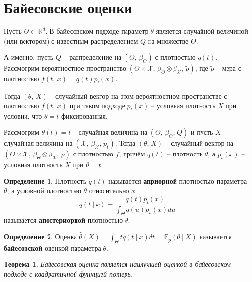 \documentclass[a4paper,12pt]{article}
\theoremstyle{plain}
\newtheorem{theorem}{Теорема}[section]
\theoremstyle{definition}
\newtheorem{definition}{Определение}[section]
\theoremstyle{remark}
\begin{document}
\section{Байесовские оценки}
Пусть $\Theta \subset \mathbb{R}^d$. В байесовском подходе параметр $\theta$ является случайной величиной (или вектором) с известным распределением $Q$ на множестве $\Theta$.

А именно, пусть $Q$ -- распределение на $(\Theta,\, \beta_\Theta)$ с плотностью $q(t)$. Рассмотрим вероятностное пространство $(\Theta \times\mathcal{X},\, \beta_\Theta\otimes\beta_\mathcal{X},\, \tilde{p})$, где $\tilde{p}$ -- мера с плотностью $f(t,\,x) = q(t)p_t(x)$. 

Тогда $(\theta,\, X)$ -- случайный вектор на этом вероятностном пространстве с плотностью $f(t,\,x)$ при таком подходе $p_t(x)$ -- условная плотность $X$ при условии, что $\theta = t$ фиксированная.

Рассмотрим $\theta(t) = t$ -- случайная величина на $(\Theta,\, \beta_\Theta,\, Q)$ и пусть $X$ -- случайная величина на $(\mathcal{X},\, \beta_\mathcal{X},\, p_t)$. Тогда $(\theta,\, X)$ -- случайный вектор на $(\Theta \times\mathcal{X},\, \beta_\Theta\otimes\beta_\mathcal{X},\, \tilde{p})$ с плотностью $f$, причём $q(t)$ -- плотность $\theta$, а $p_t(x)$ -- условная плотность $X$ при $\theta = t$

\begin{definition}
  Плотность $q(t)$ называется \textbf{априорной} плотностью параметра $\theta$, а условной плотностью $\theta$ относительно $x$ 
  \[
    q(t \:\vert\: x) = \frac{q(t)p_t(x)}{\int_\Theta q(u)p_u(x)du}
  \]
  называется \textbf{апостериорной} плотностью $\theta$.
\end{definition}

\begin{definition}
  Оценка $\hat{\theta}(X) = \int_\Theta tq(t \:\vert\: x)dt = \mathbb{E}_{\tilde{p}}(\theta \:\vert\: X)$ называется \textbf{байесовской} оценкой параметра $\theta$.
\end{definition}

\begin{theorem}
  Байесовская оценка является наилучшей оценкой в байесовском подходе с квадратичной функцией потерь.
\end{theorem}
\end{document}
